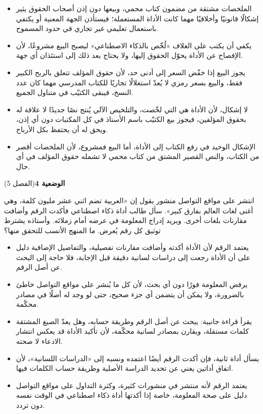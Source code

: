 \documentclass[11pt,a4paper]{article}
\begin{document}
\begin{itemize}[leftmargin=1.0cm, labelsep=6pt, itemsep=3pt, topsep=4pt, parsep=0pt]
  \item[\textbf{أ)}] الملخصات مشتقة من مضمون كتاب محمي، وبيعها دون إذن أصحاب الحقوق يثير إشكالًا قانونيًا وأخلاقيًا مهما كانت الأداة المستعملة؛ فيستأذن الجهة المعنية أو يكتفي باستعمال تعليمي غير تجاري في حدود المسموح.
  \item[\textbf{ب)}] يكفي أن يكتب على الغلاف «لُخّص بالذكاء الاصطناعي» ليصبح البيع مشروعًا، لأن الإفصاح عن الأداة يحوّل الحقوق إليها، ولا يحتاج بعد ذلك إلى استئذان أي جهة.
  \item[\textbf{ج)}] يجوز البيع إذا خفّض السعر إلى أدنى حد، لأن حقوق المؤلف تتعلق بالربح الكبير فقط، والبيع بسعر رمزي لا يُعدّ استغلالًا تجاريًا للكتاب المدرسي مهما كان عدد النسخ، فيبقى الكتيّب في متناول الجميع.
  \item[\textbf{د)}] لا إشكال، لأن الأداة هي التي لخّصت، والتلخيص الآلي يُنتج نصًا جديدًا لا علاقة له بحقوق المؤلفين، فيجوز بيع الكتيّب باسم الأستاذ في كل المكتبات دون أي إذن، ويحق له أن يحتفظ بكل الأرباح.
  \item[\textbf{هـ)}] الإشكال الوحيد في رفع الكتاب إلى الأداة، أما البيع فمشروع، لأن الملخصات أقصر من الكتاب، والنص القصير المشتق من كتاب محمي لا تشمله حقوق المؤلف في أي حال.
\end{itemize}
\par\vspace{6pt}
\noindent
{\large\khatt\textbf{الوضعية 4}}\hfill{\small(الفصل 5)}\par\nopagebreak\vspace{3pt}
\setlength{\fboxsep}{7pt}\colorbox{gray!10}{\parbox{\dimexpr\linewidth-14pt}{انتشر على مواقع التواصل منشور يقول إن «العربية تضم اثني عشر مليون كلمة، وهي أغنى لغات العالم بفارق كبير». سأل طالب أداة ذكاء اصطناعي فأكدت الرقم وأضافت مقارنات بلغات أخرى. ويريد إدراج المعلومة في عرضه أمام زملائه. وأستاذه يشترط توثيق كل رقم يُعرض. ما المنهج الأنسب للتحقق منها؟}}\par\nopagebreak
\begin{itemize}[leftmargin=1.0cm, labelsep=6pt, itemsep=3pt, topsep=4pt, parsep=0pt]
  \item[\textbf{أ)}] يعتمد الرقم لأن الأداة أكدته وأضافت مقارنات تفصيلية، والتفاصيل الإضافية دليل على أن الأداة رجعت إلى دراسات لسانية دقيقة قبل الإجابة، فلا حاجة إلى البحث عن أصل الرقم.
  \item[\textbf{ب)}] يرفض المعلومة فورًا دون أي بحث، لأن كل ما يُنشر على مواقع التواصل خاطئ بالضرورة، ولا يمكن أن يتضمن أي جزء صحيح، حتى لو وجد له أصلًا في مصادر محكّمة.
  \item[\textbf{ج)}] يقرأ قراءة جانبية: يبحث عن أصل الرقم وطريقة حسابه، وهل يعدّ الصيغ المشتقة كلمات مستقلة، ويقارن بمصادر لسانية محكّمة، لأن تأكيد الأداة قد يعكس انتشار الادعاء لا صحته.
  \item[\textbf{د)}] يسأل أداة ثانية، فإن أكدت الرقم أيضًا اعتمده ونسبه إلى «الدراسات اللسانية»، لأن اتفاق أداتين يغني عن تحديد الدراسة الأصلية وطريقة حساب الكلمات فيها.
  \item[\textbf{هـ)}] يعتمد الرقم لأنه منتشر في منشورات كثيرة، وكثرة التداول على مواقع التواصل دليل على صحة المعلومة، خاصة إذا أكدتها أداة ذكاء اصطناعي في الوقت نفسه دون تردد.
\end{itemize}
\end{document}
